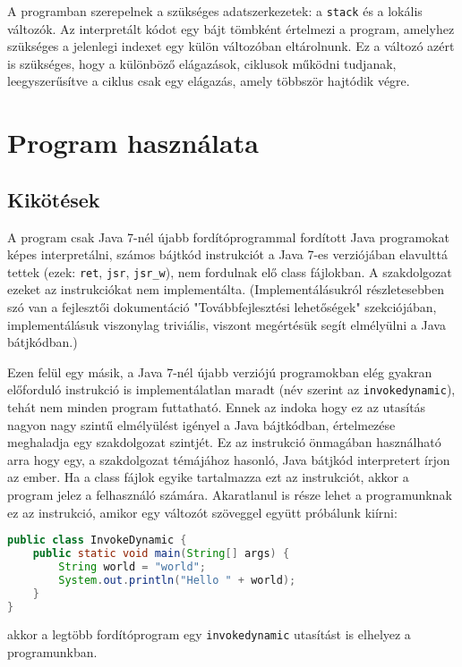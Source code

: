 A programban szerepelnek a szükséges adatszerkezetek: a \lstinline{stack} és a lokális változók. Az interpretált kódot egy bájt tömbként értelmezi a program, amelyhez szükséges a jelenlegi indexet egy külön változóban eltárolnunk. Ez a változó azért is szükséges, hogy a különböző elágazások, ciklusok működni tudjanak, leegyszerűsítve a ciklus csak egy elágazás, amely többször hajtódik végre.

\section{Program használata}

\subsection{Kikötések}
A program csak Java 7-nél újabb fordítóprogrammal fordított Java programokat képes interpretálni, számos bájtkód instrukciót a Java 7-es verziójában elavulttá tettek (ezek: \lstinline{ret}, \lstinline{jsr}, \lstinline{jsr_w}), nem fordulnak elő class fájlokban. A szakdolgozat ezeket az instrukciókat nem implementálta. (Implementálásukról részletesebben szó van a fejlesztői dokumentáció "Továbbfejlesztési lehetőségek" szekciójában, implementálásuk viszonylag triviális, viszont megértésük segít elmélyülni a Java bátjkódban.)

Ezen felül egy másik, a Java 7-nél újabb verziójú programokban elég gyakran előforduló instrukció is implementálatlan maradt (név szerint az \lstinline{invokedynamic}), tehát nem minden program futtatható. Ennek az indoka hogy ez az utasítás nagyon nagy szintű elmélyülést igényel a Java bájtkódban, értelmezése meghaladja egy szakdolgozat szintjét. Ez az instrukció önmagában használható arra hogy egy, a szakdolgozat témájához hasonló, Java bátjkód interpretert írjon az ember. Ha a class fájlok egyike tartalmazza ezt az instrukciót, akkor a program jelez a felhasználó számára. Akaratlanul is része lehet a programunknak ez az instrukció, amikor egy változót szöveggel együtt próbálunk kiírni:
\begin{lstlisting}[language={Java}]
public class InvokeDynamic {
	public static void main(String[] args) {
		String world = "world";
		System.out.println("Hello " + world);
	}
}
\end{lstlisting}
akkor a legtöbb fordítóprogram egy \lstinline{invokedynamic} utasítást is elhelyez a programunkban.

